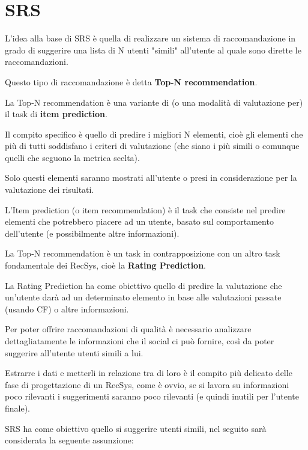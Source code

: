 \section{SRS}
L'idea alla base di SRS è quella di realizzare un sistema di raccomandazione in grado di suggerire una lista di N utenti "simili" all'utente al quale sono dirette le raccomandazioni.

Questo tipo di raccomandazione è detta \textbf{Top-N recommendation}.

La Top-N recommendation è una variante di (o una modalità di valutazione per) il task di \textbf{item prediction}.

Il compito specifico è quello di predire i migliori N elementi, cioè gli elementi che più di tutti soddisfano i criteri di valutazione (che siano i più simili o comunque quelli che seguono la metrica scelta).


Solo questi elementi saranno mostrati all'utente o presi in considerazione per la valutazione dei risultati.

L'Item prediction (o item recommendation) è il task che consiste nel predire elementi che potrebbero piacere ad un utente, basato sul comportamento dell'utente (e possibilmente altre informazioni).

La Top-N recommendation è un task in contrapposizione con un altro task fondamentale dei RecSys, cioè la \textbf{Rating Prediction}.

La Rating Prediction ha come obiettivo quello di predire la valutazione che un'utente darà ad un determinato elemento in base alle valutazioni passate (usando CF) o altre informazioni.

Per poter offrire raccomandazioni di qualità è necessario analizzare dettagliatamente le informazioni che il social ci può fornire, così da poter suggerire all'utente utenti simili a lui.

Estrarre i dati e metterli in relazione tra di loro è il compito più delicato delle fase di progettazione di un RecSys, come è ovvio, se si lavora su informazioni poco rilevanti i suggerimenti saranno poco rilevanti (e quindi inutili per l'utente finale).

SRS ha come obiettivo quello si suggerire utenti simili, nel seguito sarà considerata la seguente assunzione:

\begin{quotation}
\end{quotation}

